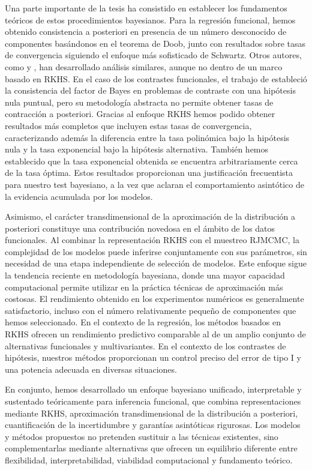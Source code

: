 Una parte importante de la tesis ha consistido en establecer los fundamentos teóricos de estos procedimientos bayesianos. Para la regresión funcional, hemos obtenido consistencia a posteriori en presencia de un número desconocido de componentes basándonos en el teorema de Doob, junto con resultados sobre tasas de convergencia siguiendo el enfoque más sofisticado de Schwartz. Otros autores, como \citet{lian2016posterior} y \citet{abraham2020posterior}, han desarrollado análisis similares, aunque no dentro de un marco basado en \acs{RKHS}. En el caso de los contrastes funcionales, el trabajo de \citet{dass2004note} estableció la consistencia del factor de Bayes en problemas de contraste con una hipótesis nula puntual, pero su metodología abstracta no permite obtener tasas de contracción a posteriori. Gracias al enfoque \acs{RKHS} hemos podido obtener resultados más completos que incluyen estas tasas de convergencia, caracterizando además la diferencia entre la tasa polinómica bajo la hipótesis nula y la tasa exponencial bajo la hipótesis alternativa. También hemos establecido que la tasa exponencial obtenida se encuentra arbitrariamente cerca de la tasa óptima. Estos resultados proporcionan una justificación frecuentista para nuestro test bayesiano, a la vez que aclaran el comportamiento asintótico de la evidencia acumulada por los modelos.

Asimismo, el carácter transdimensional de la aproximación de la distribución a posteriori constituye una contribución novedosa en el ámbito de los datos funcionales. Al combinar la representación \acs{RKHS} con el muestreo \acs{RJMCMC}, la complejidad de los modelos puede inferirse conjuntamente con sus parámetros, sin necesidad de una etapa independiente de selección de modelos. Este enfoque sigue la tendencia reciente en metodología bayesiana, donde una mayor capacidad computacional permite utilizar en la práctica técnicas de aproximación más costosas. El rendimiento obtenido en los experimentos numéricos es generalmente satisfactorio, incluso con el número relativamente pequeño de componentes que hemos seleccionado. En el contexto de la regresión, los métodos basados en \acs{RKHS} ofrecen un rendimiento predictivo comparable al de un amplio conjunto de alternativas funcionales y multivariantes. En el contexto de los contrastes de hipótesis, nuestros métodos proporcionan un control preciso del error de tipo I y una potencia adecuada en diversas situaciones.

En conjunto, hemos desarrollado un enfoque bayesiano unificado, interpretable y sustentado teóricamente para inferencia funcional, que combina representaciones mediante \acs{RKHS}, aproximación transdimensional de la distribución a posteriori, cuantificación de la incertidumbre y garantías asintóticas rigurosas. Los modelos y métodos propuestos no pretenden sustituir a las técnicas existentes, sino complementarlas mediante alternativas que ofrecen un equilibrio diferente entre flexibilidad, interpretabilidad, viabilidad computacional y fundamento teórico.

